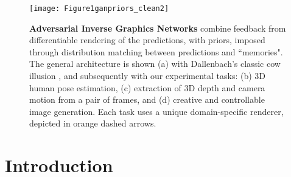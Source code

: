 \documentclass[10pt,twocolumn,letterpaper]{article}
\begin{document}
\begin{bibunit}[ieee]
\begin{abstract}

\end{abstract}
\begin{figure}[t!]
    \centering
    \texttt{[image: Figure1ganpriors\_clean2]}
     \centering
    \caption{\textbf{Adversarial Inverse Graphics Networks} combine feedback from differentiable rendering of the predictions, with priors, imposed through distribution matching between predictions and ``memories". The general architecture is shown (a) with Dallenbach's classic cow illusion \cite{cow}, and subsequently with our experimental tasks: (b) 3D human pose estimation, (c) extraction of 3D depth and camera motion from a pair of frames, and (d) creative and controllable image generation. Each task uses a unique domain-specific renderer, depicted in orange dashed arrows. 
    }
\label{fig:architecture}
\end{figure}\section{Introduction}

\end{bibunit}
\end{document}
